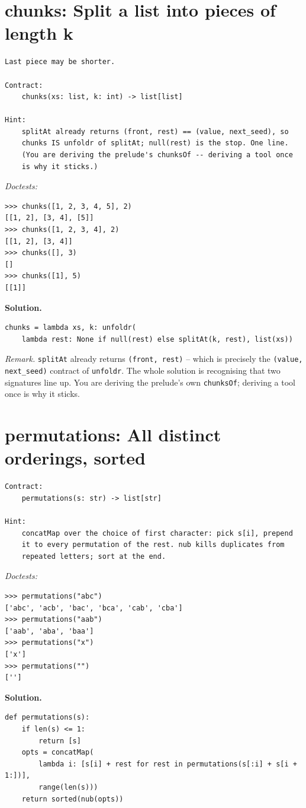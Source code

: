 \documentclass[11pt,letterpaper]{book}
\begin{document}
\section{chunks: Split a list into pieces of length k}
\begin{lstlisting}[style=spec]
Last piece may be shorter.

Contract:
    chunks(xs: list, k: int) -> list[list]

Hint:
    splitAt already returns (front, rest) == (value, next_seed), so
    chunks IS unfoldr of splitAt; null(rest) is the stop. One line.
    (You are deriving the prelude's chunksOf -- deriving a tool once
    is why it sticks.)
\end{lstlisting}
\noindent\textit{Doctests:}
\begin{lstlisting}[style=spec]
>>> chunks([1, 2, 3, 4, 5], 2)
[[1, 2], [3, 4], [5]]
>>> chunks([1, 2, 3, 4], 2)
[[1, 2], [3, 4]]
>>> chunks([], 3)
[]
>>> chunks([1], 5)
[[1]]
\end{lstlisting}
\noindent\textbf{Solution.}
\begin{lstlisting}[style=code]
chunks = lambda xs, k: unfoldr(
    lambda rest: None if null(rest) else splitAt(k, rest), list(xs))
\end{lstlisting}

\noindent\textit{Remark.} \texttt{splitAt} already returns \texttt{(front, rest)} -- which
is precisely the \texttt{(value, next\_seed)} contract of \texttt{unfoldr}. The
whole solution is recognising that two signatures line up. You are deriving the
prelude's own \texttt{chunksOf}; deriving a tool once is why it sticks.

\section{permutations: All distinct orderings, sorted}
\begin{lstlisting}[style=spec]
Contract:
    permutations(s: str) -> list[str]

Hint:
    concatMap over the choice of first character: pick s[i], prepend
    it to every permutation of the rest. nub kills duplicates from
    repeated letters; sort at the end.
\end{lstlisting}
\noindent\textit{Doctests:}
\begin{lstlisting}[style=spec]
>>> permutations("abc")
['abc', 'acb', 'bac', 'bca', 'cab', 'cba']
>>> permutations("aab")
['aab', 'aba', 'baa']
>>> permutations("x")
['x']
>>> permutations("")
['']
\end{lstlisting}
\noindent\textbf{Solution.}
\begin{lstlisting}[style=code]
def permutations(s):
    if len(s) <= 1:
        return [s]
    opts = concatMap(
        lambda i: [s[i] + rest for rest in permutations(s[:i] + s[i + 1:])],
        range(len(s)))
    return sorted(nub(opts))
\end{lstlisting}
\end{document}
